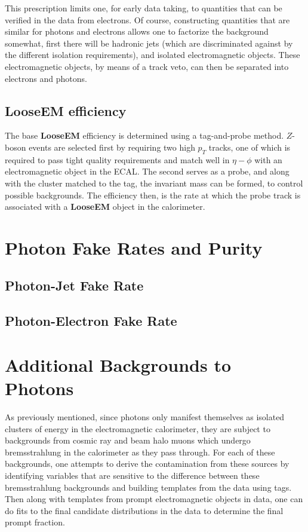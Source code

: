 \documentclass{cmspaper}
\begin{document}
This prescription limits one, for early data taking, to quantities that can be verified in the data from electrons.  Of course, constructing quantities that are similar for photons and electrons allows one to factorize the background somewhat, first there will be hadronic jets (which are discriminated against by the different isolation requirements), and isolated electromagnetic objects.  These electromagnetic objects, by means of a track veto, can then be separated into electrons and photons.
\subsection{LooseEM efficiency}\label{ssec:LooseEMEff}
The base {\bf LooseEM} efficiency is determined using a tag-and-probe method.  $Z$-boson events are selected first by requiring two high $p_T$ tracks, one of which is required to pass tight quality requirements and match well in $\eta-\phi$ with an electromagnetic object in the ECAL.  The second serves as a probe, and along with the cluster matched to the tag, the invariant mass can be formed, to control possible backgrounds.  The efficiency then, is the rate at which the probe track is associated with a {\bf LooseEM} object in the calorimeter.

\section{Photon Fake Rates and Purity}
\subsection{Photon-Jet Fake Rate}
\subsection{Photon-Electron Fake Rate}


\section{Additional Backgrounds to Photons}
As previously mentioned, since photons only manifest themselves as isolated clusters of energy in the electromagnetic calorimeter, they are subject to backgrounds from cosmic ray and beam halo muons which undergo bremsstrahlung in the calorimeter as they pass through.  For each of these backgrounds, one attempts to derive the contamination from these sources by identifying variables that are sensitive to the difference between these bremsstrahlung backgrounds and building templates from the data using tags.  Then along with templates from prompt electromagnetic objects in data, one can do fits to the final candidate distributions in the data to determine the final prompt fraction.
\end{document}
